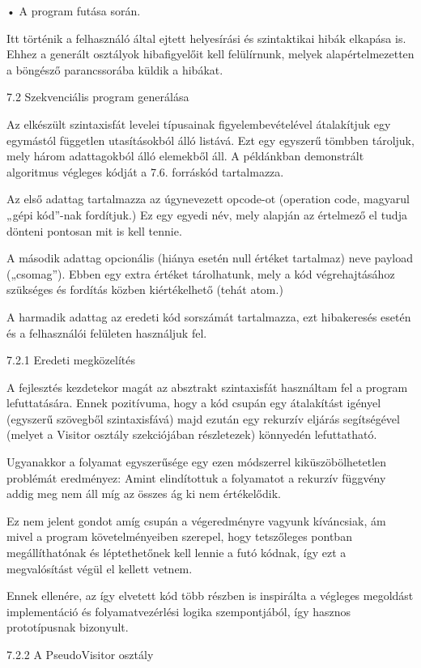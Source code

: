     • A program futása során.

Itt történik a felhasználó által ejtett helyesírási és szintaktikai hibák elkapása is. Ehhez a generált osztályok hibafigyelőit kell felülírnunk, melyek alapértelmezetten a böngésző parancssorába küldik a hibákat.

7.2 Szekvenciális program generálása

Az elkészült szintaxisfát levelei típusainak figyelembevételével átalakítjuk egy egymástól független utasításokból álló listává. Ezt egy egyszerű tömbben tároljuk, mely három adattagokból álló elemekből áll. A példánkban demonstrált algoritmus végleges kódját a 7.6. forráskód tartalmazza.

Az első adattag tartalmazza az úgynevezett opcode-ot (operation code, magyarul „gépi kód”-nak fordítjuk.) Ez egy egyedi név, mely alapján az értelmező el tudja dönteni pontosan mit is kell tennie.

A második adattag opcionális (hiánya esetén null értéket tartalmaz) neve payload („csomag”). Ebben egy extra értéket tárolhatunk, mely a kód végrehajtásához szükséges és fordítás közben kiértékelhető (tehát atom.)

A harmadik adattag az eredeti kód sorszámát tartalmazza, ezt hibakeresés esetén és a felhasználói felületen használjuk fel.

7.2.1 Eredeti megközelítés

A fejlesztés kezdetekor magát az absztrakt szintaxisfát használtam fel a program lefuttatására. Ennek pozitívuma, hogy a kód csupán egy átalakítást igényel (egyszerű szövegből szintaxisfává) majd ezután egy rekurzív eljárás segítségével (melyet a Visitor osztály szekciójában részletezek) könnyedén lefuttatható.

Ugyanakkor a folyamat egyszerűsége egy ezen módszerrel kiküszöbölhetetlen problémát eredményez: Amint elindítottuk a folyamatot a rekurzív függvény addig meg nem áll míg az összes ág ki nem értékelődik. 

Ez nem jelent gondot amíg csupán a végeredményre vagyunk kíváncsiak, ám mivel a program követelményeiben szerepel, hogy tetszőleges pontban megállíthatónak és léptethetőnek kell lennie a futó kódnak, így ezt a megvalósítást végül el kellett vetnem.

Ennek ellenére, az így elvetett kód több részben is inspirálta a végleges megoldást implementáció és folyamatvezérlési logika szempontjából, így hasznos prototípusnak bizonyult.

7.2.2 A PseudoVisitor osztály

